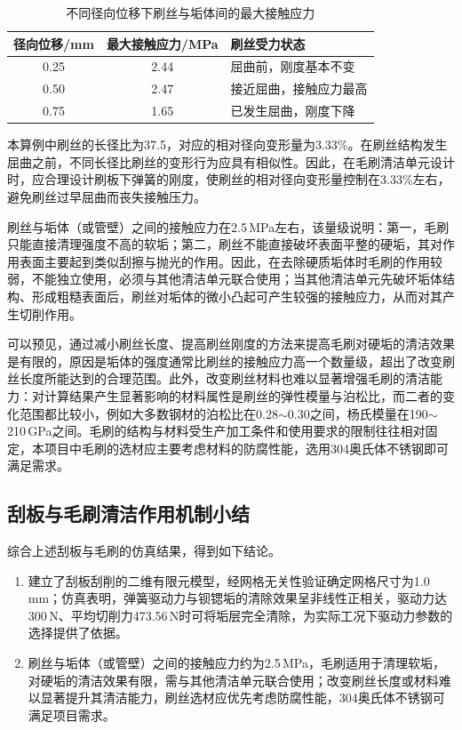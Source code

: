 \begin{table}[H]
	\centering
	\caption{不同径向位移下刷丝与垢体间的最大接触应力}
	\label{tab:brush_contact_stress}
	\renewcommand{\arraystretch}{1.3}
	\begin{tabularx}{0.85\textwidth}{cc>{\raggedright\arraybackslash}X}
		\toprule
		径向位移/mm & 最大接触应力/MPa & 刷丝受力状态 \\
		\midrule
		0.25 & 2.44 & 屈曲前，刚度基本不变 \\
		0.50 & 2.47 & 接近屈曲，接触应力最高 \\
		0.75 & 1.65 & 已发生屈曲，刚度下降 \\
		\bottomrule
	\end{tabularx}
\end{table}

本算例中刷丝的长径比为37.5，对应的相对径向变形量为3.33\%。在刷丝结构发生屈曲之前，不同长径比刷丝的变形行为应具有相似性。因此，在毛刷清洁单元设计时，应合理设计刷板下弹簧的刚度，使刷丝的相对径向变形量控制在3.33\%左右，避免刷丝过早屈曲而丧失接触压力。

刷丝与垢体（或管壁）之间的接触应力在2.5\,MPa左右，该量级说明：第一，毛刷只能直接清理强度不高的软垢；第二，刷丝不能直接破坏表面平整的硬垢，其对作用表面主要起到类似刮擦与抛光的作用。因此，在去除硬质垢体时毛刷的作用较弱，不能独立使用，必须与其他清洁单元联合使用；当其他清洁单元先破坏垢体结构、形成粗糙表面后，刷丝对垢体的微小凸起可产生较强的接触应力，从而对其产生切削作用。

可以预见，通过减小刷丝长度、提高刷丝刚度的方法来提高毛刷对硬垢的清洁效果是有限的，原因是垢体的强度通常比刷丝的接触应力高一个数量级，超出了改变刷丝长度所能达到的合理范围。此外，改变刷丝材料也难以显著增强毛刷的清洁能力：对计算结果产生显著影响的材料属性是刷丝的弹性模量与泊松比，而二者的变化范围都比较小，例如大多数钢材的泊松比在0.28$\sim$0.30之间，杨氏模量在190$\sim$210\,GPa之间。毛刷的结构与材料受生产加工条件和使用要求的限制往往相对固定，本项目中毛刷的选材应主要考虑材料的防腐性能，选用304奥氏体不锈钢即可满足需求。

\subsection{刮板与毛刷清洁作用机制小结}
\label{subsec:cleaning_mechanism_summary}

综合上述刮板与毛刷的仿真结果，得到如下结论。

\begin{enumerate}[label=（\arabic*）,leftmargin=2.6em,itemsep=2pt]
\item 建立了刮板刮削的二维有限元模型，经网格无关性验证确定网格尺寸为1.0\,mm；仿真表明，弹簧驱动力与钡锶垢的清除效果呈非线性正相关，驱动力达300\,N、平均切削力473.56\,N时可将垢层完全清除，为实际工况下驱动力参数的选择提供了依据。

\item 刷丝与垢体（或管壁）之间的接触应力约为2.5\,MPa，毛刷适用于清理软垢，对硬垢的清洁效果有限，需与其他清洁单元联合使用；改变刷丝长度或材料难以显著提升其清洁能力，刷丝选材应优先考虑防腐性能，304奥氏体不锈钢可满足项目需求。
\end{enumerate}
